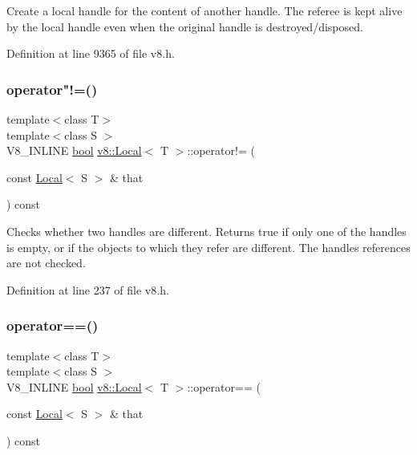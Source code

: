 Create a local handle for the content of another handle. The referee is kept alive by the local handle even when the original handle is destroyed/disposed. 

Definition at line 9365 of file v8.\+h.

\mbox{\label{classv8_1_1Local_a3b2ae1c0415d319099ebc2fd059dbb10}} 
\subsubsection{\texorpdfstring{operator"!=()}{operator!=()}}
{\footnotesize\ttfamily template$<$class T$>$ \\
template$<$class S $>$ \\
V8\+\_\+\+I\+N\+L\+I\+NE \mbox{\hyperlink{classbool}{bool}} \mbox{\hyperlink{classv8_1_1Local}{v8\+::\+Local}}$<$ T $>$\+::operator!= (\begin{DoxyParamCaption}\item[{const \mbox{\hyperlink{classv8_1_1Local}{Local}}$<$ S $>$ \&}]{that }\end{DoxyParamCaption}) const\hspace{0.3cm}{\ttfamily [inline]}}

Checks whether two handles are different. Returns true if only one of the handles is empty, or if the objects to which they refer are different. The handles\textquotesingle{} references are not checked. 

Definition at line 237 of file v8.\+h.

\mbox{\label{classv8_1_1Local_a0dfaa25015487674f568a4e1cd0be48c}} 
\subsubsection{\texorpdfstring{operator==()}{operator==()}}
{\footnotesize\ttfamily template$<$class T$>$ \\
template$<$class S $>$ \\
V8\+\_\+\+I\+N\+L\+I\+NE \mbox{\hyperlink{classbool}{bool}} \mbox{\hyperlink{classv8_1_1Local}{v8\+::\+Local}}$<$ T $>$\+::operator== (\begin{DoxyParamCaption}\item[{const \mbox{\hyperlink{classv8_1_1Local}{Local}}$<$ S $>$ \&}]{that }\end{DoxyParamCaption}) const\hspace{0.3cm}{\ttfamily [inline]}}

